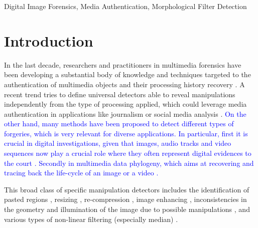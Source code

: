 \documentclass{ieeeaccess}
\begin{document}
\begin{keywords}
Digital Image Forensics, Media Authentication, Morphological Filter Detection
%
\end{keywords}

\titlepgskip=-15pt

\maketitle

\section{Introduction}
\label{sec:intro}

In the last decade, researchers and practitioners in multimedia forensics have been developing a substantial body of knowledge and techniques targeted to the authentication of multimedia objects and their processing history recovery \cite{stamm_overview, farid_book, ho, piva_overview, sencar_book}. 
A recent trend tries to define universal detectors able to reveal manipulations independently from the type of processing applied, which could leverage media authentication in applications like journalism or social media analysis \cite{noiseprint}. 
\textcolor{blue}{On the other hand, many methods have been proposed to detect different types of forgeries, which is very relevant for diverse applications. In particular, first it is crucial in digital investigations, given that images, audio tracks and video sequences now play a crucial role where they often represent digital evidences to the court \cite{forlab}. Secondly in multimedia data phylogeny, which aims at recovering and tracing back the life-cycle of an image or a video \cite{Bestagini2016, Dias2012, Oliveira2016, Costa2014}.}

This broad class of specific manipulation detectors includes the identification of pasted regions \cite{cm2, cm3, cm4, spl2, spl3}, resizing \cite{fernando2017, PB-TIFS-2019}, re-compression \cite{PBPG2017-TIFS},  image enhancing \cite{shan2019robust}, inconsistencies in the geometry and illumination of the image due to possible manipulations \cite{geom1, geom2, phys1}, and various types of non-linear filtering (especially median) \cite{Bahrami2015, Cao2014, Cao2011, Fridrich2010, Tian2010, Yuan:2011, Liu2013, Huang2013, Shi2014, Wang2015, Pasquini2016-TIFS, gao2019robust}. 
\end{document}
